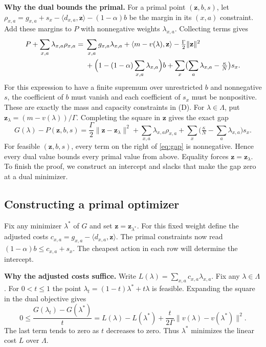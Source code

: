 \documentclass[12pt,a4paper]{article}
\numberwithin{equation}{section}
\newcommand{\ip}[2]{\langle #1,#2\rangle}
\newcommand{\norm}[1]{\lVert #1\rVert}
\newcommand{\lead}[1]{\par\smallskip\noindent\textbf{#1}\enspace}
\begin{document}
\lead{Why the dual bounds the primal.}
For a primal point \((\mathbf z,b,s)\), let
\(\rho_{x,a}=g_{x,a}+s_x-\ip{d_{x,a}}{\mathbf z}-(1-\alpha)b\) be the margin in its
\((x,a)\) constraint. Add these margins to \(P\) with nonnegative weights
\(\lambda_{x,a}\). Collecting terms gives
\[
\begin{aligned}
 P+\sum_{x,a}\lambda_{x,a}\rho_{x,a}
   ={}&\sum_{x,a}g_{x,a}\lambda_{x,a}
        +\ip{m-v(\lambda)}{\mathbf z}-\tfrac{\Gamma}{2}\norm{\mathbf z}^2\\
     &+\Bigl(1-(1-\alpha)\sum_{x,a}\lambda_{x,a}\Bigr)b
       +\sum_x\bigl(\sum_a\lambda_{x,a}-\tfrac{\kappa}{N}\bigr)s_x .
\end{aligned}
\]
For this expression to have a finite supremum over unrestricted \(b\)
and nonnegative \(s\), the coefficient of \(b\) must vanish and each
coefficient of \(s_x\) must be nonpositive. These are exactly the mass
and capacity constraints in (D). For \(\lambda\in\Lambda\), put
\(\mathbf z_\lambda=(m-v(\lambda))/\Gamma\). Completing the square in \(\mathbf z\)
gives the exact gap
\begin{equation}
  G(\lambda)-P(\mathbf z,b,s)
  =\frac{\Gamma}{2}\norm{\mathbf z-\mathbf z_\lambda}^2
      +\sum_{x,a}\lambda_{x,a}\rho_{x,a}
      +\sum_x\bigl(\tfrac{\kappa}{N}-\sum_a\lambda_{x,a}\bigr)s_x .
  \label{eq:gap}
\end{equation}
For feasible \((\mathbf z,b,s)\), every term on the right of \eqref{eq:gap} is
nonnegative. Hence every dual value bounds every primal value from above.
Equality forces \(\mathbf z=\mathbf z_\lambda\). To finish the proof, we construct an
intercept and slacks that make the gap zero at a dual minimizer.

\newpage
\subsection*{Constructing a primal optimizer}
Fix any minimizer \(\lambda^*\) of \(G\) and set
\(\mathbf z=\mathbf z_{\lambda^*}\). For this fixed weight define the adjusted costs
\(c_{x,a}=g_{x,a}-\ip{d_{x,a}}{\mathbf z}\). The primal constraints now read
\((1-\alpha)b\le c_{x,a}+s_x\). The cheapest action in each row will determine the intercept.

\lead{Why the adjusted costs suffice.}
Write \(L(\lambda)=\sum_{x,a}c_{x,a}\lambda_{x,a}\). Fix any
\(\lambda\in\Lambda\). For \(0<t\le1\) the point
\(\lambda_t=(1-t)\lambda^*+t\lambda\) is feasible. Expanding the square in
the dual objective gives
\[
  0\le\frac{G(\lambda_t)-G(\lambda^*)}{t}
   = L(\lambda)-L(\lambda^*)
     +\frac{t}{2\Gamma}\norm{v(\lambda)-v(\lambda^*)}^2 .
\]
The last term tends to zero as \(t\) decreases to zero. Thus \(\lambda^*\)
minimizes the linear cost \(L\) over \(\Lambda\).
\end{document}

